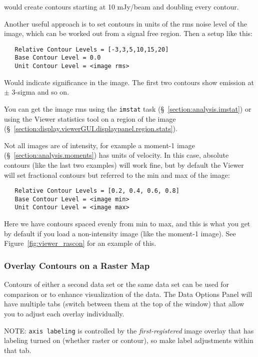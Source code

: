 would create contours starting at 10 mJy/beam and doubling every contour.

Another useful approach is to set contours in units of the rms noise level of the image,
which can be worked out from a signal free region. Then a setup like this:

\small
\begin{verbatim}
   Relative Contour Levels = [-3,3,5,10,15,20]
   Base Contour Level = 0.0
   Unit Contour Level = <image rms>
\end{verbatim}
\normalsize

Would indicate significance in the image. The first two contours 
show emission at $\pm$ 3-sigma and so on.

You can get the image rms using the {\tt imstat} task 
(\S~\ref{section:analysis.imstat}) or using the Viewer statistics
tool on a region of the image 
(\S~\ref{section:display.viewerGUI.displaypanel.region.stats}).

Not all images are of intensity, for example a
moment-1 image (\S~\ref{section:analysis.moments}) has units of
velocity.  In this case, absolute contours (like the last two examples) 
will work fine,  but by default the Viewer will
set fractional contours but referred to the min and max of the image:
\small
\begin{verbatim}
   Relative Contour Levels = [0.2, 0.4, 0.6, 0.8]
   Base Contour Level = <image min>
   Unit Contour Level = <image max>
\end{verbatim}
\normalsize
Here we have contours spaced evenly from min to max, and this is
what you get by default if you load a non-intensity image (like
the moment-1 image).  See Figure~\ref{fig:viewer_rascon} for an
example of this.

\subsubsection{Overlay Contours on a Raster Map}
\label{section:display.image.viewcontours}

Contours of either a second data set or the same data set can be used
for comparison or to enhance visualization of the data. The Data Options
Panel will have multiple tabs (switch between them at the top of the window) 
that allow you to adjust each overlay individually.  

NOTE: {\tt axis labeling} is controlled
by the {\it first-registered} image overlay that has labeling turned on
(whether raster or contour), so make label adjustments within that tab.

